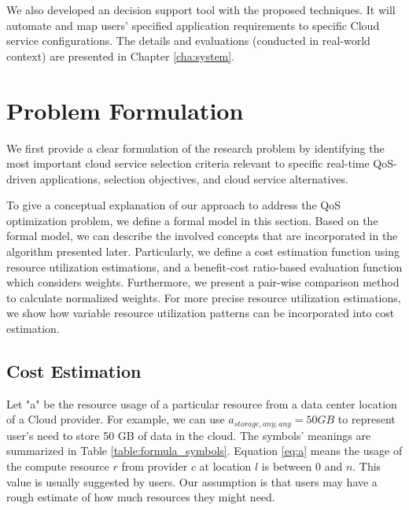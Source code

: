 We also developed an decision support tool with the proposed techniques. It will automate and map users' specified application requirements to specific Cloud service configurations. The details and evaluations (conducted in real-world context) are presented in Chapter \ref{cha:system}.

\section{Problem Formulation}
We first provide a clear formulation of the research problem by identifying the most important cloud service selection criteria relevant to specific real-time QoS-driven applications, selection objectives, and cloud service alternatives.

To give a conceptual explanation of our approach to address the QoS optimization problem, we define a formal model in this section. Based on the formal model, we can describe the involved concepts that are incorporated in the algorithm presented later. Particularly, we define a cost estimation function using resource utilization estimations, and a benefit-cost ratio-based evaluation function which considers weights. Furthermore, we present a pair-wise comparison method to calculate normalized weights. For more precise resource utilization estimations, we show how variable resource utilization patterns can be incorporated into cost estimation.

\subsection{Cost Estimation}
Let "a" be the resource usage of a particular resource from a data center location of a Cloud provider. For example, we can use $a_{storage,any,any}=50 GB$ to represent user's need to store 50 GB of data in the cloud. The symbols' meanings are summarized in Table \ref{table:formula_symbols}. Equation \ref{eq:a} means the usage of the compute resource $r$ from provider $c$ at location $l$ is between $0$ and $n$. This value is usually suggested by users. Our assumption is that users may have a rough estimate of how much resources they might need.

